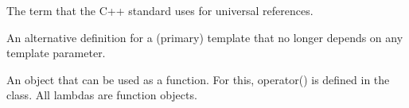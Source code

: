 


The term that the C++ standard uses for universal references.


An alternative definition for a (primary) template that no longer depends on any template parameter.


An object that can be used as a function. For this, operator() is defined in the class. All lambdas are function objects.